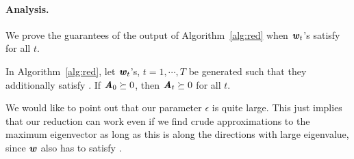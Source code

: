 \paragraph{Analysis.}
We prove the guarantees of the output of Algorithm~\ref{alg:red} when $\ww_t$'s satisfy  for all $t$.


\begin{lemma}\label{lem:orthoUpdate}
In Algorithm~\ref{alg:red}, let $\ww_t$'s, $t=1,\cdots, T$ be generated such that they additionally satisfy . If $\AA_0\succeq 0$, then $\AA_t \succeq 0$ for all $t$.
\end{lemma}
 We would like to point out that our parameter $\epsilon$ is quite large. This just implies that our reduction can work even if we find crude approximations to the maximum eigenvector as long as this is along the directions with large eigenvalue, since $\ww$ also has to satisfy .
